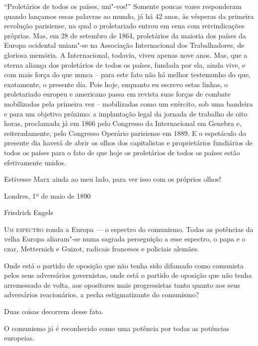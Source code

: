  “Proletários de todos os países, uni"-vos!” Somente poucas vozes
responderam quando lançamos essas palavras ao mundo, já há 42 anos, às vésperas da primeira revolução parisiense, na qual o
proletariado entrou em cena com reivindicações próprias. Mas, em 28 de
setembro de 1864, proletários da maioria dos países da Europa ocidental
uniam"-se na Associação Internacional dos Trabalhadores, de gloriosa
memória. A Internacional, todavia, viveu apenas nove anos. Mas, que a
eterna aliança dos proletários de todos os países, fundada por ela,
ainda vive, e com mais força do que nunca – para este fato não há
melhor testemunho do que, exatamente, o presente dia. Pois hoje, enquanto
eu escrevo estas linhas, o proletariado europeu e americano passa em
revista suas forças de combate mobilizadas pela primeira vez –
mobilizadas como um exército, sob uma bandeira e para um objetivo
próximo: a implantação legal da jornada de trabalho de oito horas,
proclamada já em 1866 pelo Congresso da Internacional em Genebra e,
reiteradamente, pelo Congresso Operário parisiense em 1889. E o
espetáculo do presente dia haverá de abrir os olhos dos capitalistas e
proprietários fundiários de todos os países para o fato de que hoje os
proletários de todos os países estão efetivamente unidos.

Estivesse Marx ainda ao meu lado, para ver isso com os próprios olhos!
\smallskip

\hfill Londres, 1º de maio de 1890

\hfill Friedrich Engels




\setcounter{secnumdepth}{4} %
\setcounter{chapter}{0}


\textsc{Um espectro} ronda a Europa  ---  o espectro do comunismo. Todas as 
potências da velha Europa aliaram"-se numa sagrada perseguição a esse 
espectro, o papa e o czar, Metternich e Guizot, radicais franceses e policiais alemães.

Onde está o partido de oposição que não tenha sido difamado como
comunista pelos seus adversários governistas, onde está o partido de
oposição que não tenha arremessado de volta, aos opositores mais
progressistas tanto quanto aos seus adversários reacionários, a pecha
estigmatizante do comunismo?

Duas coisas decorrem desse fato.

O comunismo já é reconhecido como uma potência por todas as potências
europeias.

